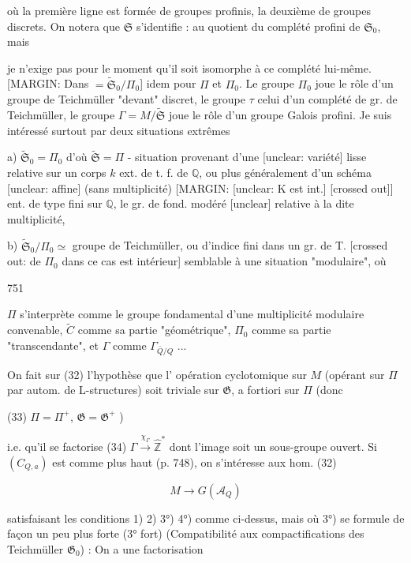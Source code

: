 où la première ligne est formée de
groupes profinis, la deuxième de groupes
discrets. On notera que $\mathfrak{S}$ s'identifie : au
quotient du complété profini de $\mathfrak{S}_0$, mais

\newpage


je n'exige pas pour le moment qu'il soit
isomorphe à ce complété lui-même. [MARGIN: Dans $= \tilde{\mathfrak{S}}_0 / \Pi_0$]
idem pour $\Pi$ et $\Pi_0$. Le groupe $\Pi_0$
joue le rôle d'un groupe de Teichmüller
"devant" discret, le groupe $\tau$ celui d'un complété
de gr. de Teichmüller, le groupe
$\Gamma = M / \tilde{\mathfrak{S}}$ joue le rôle d'un groupe
Galois profini. Je suis intéressé
surtout par deux situations extrêmes

a) $\tilde{\mathfrak{S}}_0 = \Pi_0$ d'où $\tilde{\mathfrak{S}} = \Pi$ - situation provenant
d'une [unclear: variété] lisse relative sur
un corps $k$ ext. de t. f. de $\mathbb{Q}$, ou
plus généralement d'un schéma [unclear: affine]
(sans multiplicité) [MARGIN: [unclear: K est int.] [crossed out]]
ent. de type fini sur $\mathbb{Q}$,
le gr. de fond. modéré [unclear]
relative à la dite multiplicité,

b) $\tilde{\mathfrak{S}}_0 / \Pi_0 \simeq$ groupe de Teichmüller,
ou d'indice fini dans un gr. de T.
[crossed out: de $\Pi_0$ dans ce cas est intérieur]
semblable à une situation "modulaire", où

\newpage


751

$\Pi$ s'interprète comme le groupe fondamental
d'une multiplicité modulaire convenable,
$\tilde{C}$ comme sa partie "géométrique", $\Pi_0$ comme
sa partie "transcendante", et $\Gamma$ comme
$\Gamma_{\bar{Q}/Q}$ ...

On fait sur (32) l'hypothèse que l'
opération cyclotomique sur $M$ (opérant sur
$\Pi$ par autom. de L-structures) soit
triviale sur $\mathfrak{G}$, a fortiori sur $\Pi$ (donc

(33) $\Pi = \Pi^+$, $\mathfrak{G} = \mathfrak{G}^+$ )

i.e. qu'il se factorise
(34) $\Gamma \xrightarrow{\chi_\Gamma} \hat{\mathbb{Z}}^*$
dont l'image soit un sous-groupe ouvert.
Si $(C_{Q,a})$ est comme plus haut
(p. 748), on s'intéresse aux hom. (32)

$$M \to G(\mathcal{A}_Q)$$

satisfaisant les conditions 1) 2) 3°) 4°)
comme ci-dessus, mais où 3°) se formule
de façon un peu plus forte
(3° fort) (Compatibilité aux compactifications des
Teichmüller $\mathfrak{G}_0$) : On a une factorisation

